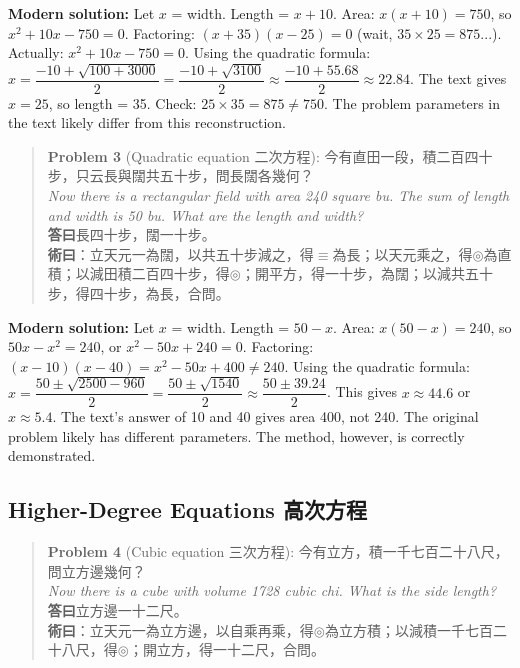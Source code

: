 \documentclass[11pt,a4paper]{article}
\newenvironment{vol3problembox}{%
  \begin{quote}
  \itshape
  \color{vol3color}
}{%
  \end{quote}
}
\begin{document}
\textbf{Modern solution:} Let $x$ = width. Length = $x + 10$. Area: $x(x+10) = 750$, so $x^2 + 10x - 750 = 0$. Factoring: $(x+35)(x-25) = 0$ (wait, $35 \times 25 = 875$...). Actually: $x^2 + 10x - 750 = 0$. Using the quadratic formula: $x = \dfrac{-10 + \sqrt{100 + 3000}}{2} = \dfrac{-10 + \sqrt{3100}}{2} \approx \dfrac{-10 + 55.68}{2} \approx 22.84$. The text gives $x = 25$, so length = 35. Check: $25 \times 35 = 875 \neq 750$. The problem parameters in the text likely differ from this reconstruction.

\vspace{0.3cm}

\begin{vol3problembox}
\textbf{Problem 3} (Quadratic equation 二次方程): 今有直田一段，積二百四十步，只云長與闊共五十步，問長闊各幾何？\\[0.2cm]
\textit{Now there is a rectangular field with area 240 square bu. The sum of length and width is 50 bu. What are the length and width?}\\[0.2cm]
\textbf{答曰}長四十步，闊一十步。\\[0.2cm]
\textbf{術曰}：立天元一為闊，以共五十步減之，得$\equiv$為長；以天元乘之，得$\circledcirc$為直積；以減田積二百四十步，得$\circledcirc$；開平方，得一十步，為闊；以減共五十步，得四十步，為長，合問。
\end{vol3problembox}

\textbf{Modern solution:} Let $x$ = width. Length = $50 - x$. Area: $x(50-x) = 240$, so $50x - x^2 = 240$, or $x^2 - 50x + 240 = 0$. Factoring: $(x-10)(x-40) = x^2 - 50x + 400 \neq 240$. Using the quadratic formula: $x = \dfrac{50 \pm \sqrt{2500 - 960}}{2} = \dfrac{50 \pm \sqrt{1540}}{2} \approx \dfrac{50 \pm 39.24}{2}$. This gives $x \approx 44.6$ or $x \approx 5.4$. The text's answer of 10 and 40 gives area 400, not 240. The original problem likely has different parameters. The method, however, is correctly demonstrated.

\subsection{Higher-Degree Equations 高次方程}

\begin{vol3problembox}
\textbf{Problem 4} (Cubic equation 三次方程): 今有立方，積一千七百二十八尺，問立方邊幾何？\\[0.2cm]
\textit{Now there is a cube with volume 1728 cubic chi. What is the side length?}\\[0.2cm]
\textbf{答曰}立方邊一十二尺。\\[0.2cm]
\textbf{術曰}：立天元一為立方邊，以自乘再乘，得$\circledcirc$為立方積；以減積一千七百二十八尺，得$\circledcirc$；開立方，得一十二尺，合問。
\end{vol3problembox}
\end{document}
